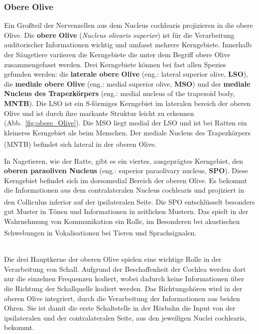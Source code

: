 \documentclass[12pt,a4paper,pdftex]{article}
\begin{document}
\subsubsection*{Obere Olive}
Ein Großteil der Nervenzellen aus dem Nucleus cochlearis projizieren in die obere Olive. Die \textbf{obere Olive} (\textit{Nucleus olivaris superior}) ist für die Verarbeitung auditorischer Informationen wichtig und umfasst mehrere Kerngebiete. Innerhalb der Säugetiere variieren die Kerngebiete die unter dem Begriff obere Olive zusammengefasst werden. Drei Kerngebiete können bei fast allen Spezies gefunden werden: die \textbf{laterale obere Olive} (eng.: lateral superior olive, \textbf{LSO}), die \textbf{mediale obere Olive} (eng.: medial superior olive, \textbf{MSO}) und der \textbf{mediale Nucleus des Trapezkörpers} (eng.: medial nucleus of the trapezoid body, \textbf{MNTB}). Die LSO ist ein S-förmiges Kerngebiet im lateralen bereich der oberen Olive und ist durch ihre markante Struktur leicht zu erkennen (Abb.~\ref{fig:obere_Olive}). Die MSO liegt medial der LSO und ist bei Ratten ein kleineres Kerngebiet als beim Menschen. Der mediale Nucleus des Trapezkörpers (MNTB) befindet sich lateral in der oberen Olive\textsuperscript{\cite[29]{paxinos2014rat}}.

In Nagetieren, wie der Ratte, gibt es ein viertes, ausgeprägtes Kerngebiet, den \textbf{oberen paraoliven Nucleus} (eng.: superior paraolivary nucleus, \textbf{SPO}). Diese Kerngebiet befindet sich im dorsomedial Bereich der oberen Olive. Es bekommt die Informationen aus dem contralateralen Nucleus cochlearis und projiziert in den Colliculus inferior auf der ipsilateralen Seite\textsuperscript{\cite[29]{paxinos2014rat}}. Die SPO entschlüsselt besonders gut Muster in Tönen und Informationen in zeitlichen Mustern. Das spielt in der Wahrnehmung von Kommunikation ein Rolle, im Besonderen bei akustischen Schwebungen in Vokalisationen bei Tieren und Sprachsignalen\textsuperscript{\cite[29]{paxinos2014rat}}. 
\\\\

\noindent Die drei Hauptkerne der oberen Olive spielen eine wichtige Rolle in der Verarbeitung von Schall. Aufgrund der Beschaffenheit der Cochlea werden dort nur die einzelnen Frequenzen kodiert, wobei dadurch keine Informationen über die Richtung der Schallquelle kodiert werden. Das Richtungshören wird in der oberen Olive integriert, durch die Verarbeitung der Informationen aus beiden Ohren. Sie ist damit die erste Schaltstelle in der Hörbahn die Input von der ipsilateralen und der contralateralen Seite, aus den jeweiligen Nuclei cochlearis, bekommt.
\\
\end{document}
